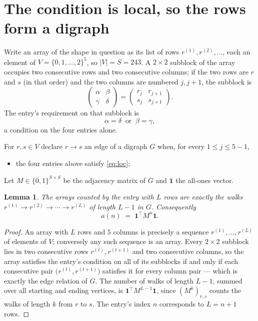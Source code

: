 \documentclass[11pt,a4paper]{article}
\theoremstyle{plain}
\newtheorem{lemma}[theorem]{Lemma}
\theoremstyle{definition}
\begin{document}
\section{The condition is local, so the rows form a digraph}

Write an array of the shape in question as its list of rows
$r^{(1)},r^{(2)},\dots$, each an element of
$V=\{0,1,\dots,2\}^{5}$, so $|V|=S=243$. A $2\times2$ subblock of the array
occupies two consecutive rows and two consecutive columns; if the two rows are $r$
and $s$ (in that order) and the two columns are numbered $j,j+1$,
the subblock is
\[
\begin{pmatrix}\alpha&\beta\\\gamma&\delta\end{pmatrix}=\begin{pmatrix}r_j&r_{j+1}\\s_j&s_{j+1}\end{pmatrix}.
\]
The entry's requirement on that subblock is
\begin{equation}\label{eq:loc}
\alpha=\delta\ \text{ or }\ \beta=\gamma,
\end{equation}
a condition on the four entries alone.

For $r,s\in V$ declare $r\to s$ an edge of a digraph $G$ when, for every
$1\le j\le 5-1$,
\begin{itemize}
\item the four entries above satisfy \eqref{eq:loc};

\end{itemize}
Let $M\in\{0,1\}^{S\times S}$ be the adjacency matrix of $G$ and $\mathbf{1}$ the
all-ones vector.

\begin{lemma}\label{lem:walk}
The arrays counted by the entry with $L$ rows are exactly the walks
$r^{(1)}\to r^{(2)}\to\cdots\to r^{(L)}$ of length $L-1$ in $G$. Consequently
\[
a(n)\;=\;\mathbf{1}^{\!\top}M^{n}\mathbf{1} .
\]
\end{lemma}

\begin{proof}
An array with $L$ rows and $5$ columns is precisely a sequence
$r^{(1)},\dots,r^{(L)}$ of elements of $V$; conversely any such sequence is an array.
Every $2\times2$ subblock lies in two consecutive rows $r^{(t)},r^{(t+1)}$ and two
consecutive columns, so the array satisfies the entry's condition on all of its subblocks
if and only if each consecutive pair $\bigl(r^{(t)},r^{(t+1)}\bigr)$ satisfies it for
every column pair --- which is exactly the edge relation of $G$. The number of walks of
length $L-1$, summed over all starting and ending vertices, is
$\mathbf{1}^{\!\top}M^{L-1}\mathbf{1}$, since $(M^{k})_{r,s}$ counts the walks of
length $k$ from $r$ to $s$. The entry's index $n$ corresponds to $L=n+1$ rows.
\end{proof}
\end{document}
